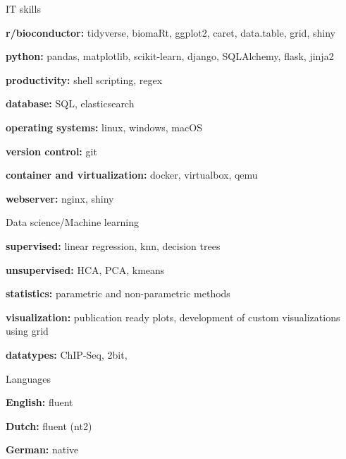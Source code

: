 

\begin{cvskills}
  \cvskill
    {IT skills} %
    {
      \begin{cvitems}
        \item {\textbf{r/bioconductor:} tidyverse, biomaRt, ggplot2, caret, data.table, grid, shiny}
        \item {\textbf{python:} pandas, matplotlib, scikit-learn, django, SQLAlchemy, flask, jinja2}
        \item {\textbf{productivity:} shell scripting, regex}
        \item {\textbf{database:} SQL, elasticsearch}
        \item {\textbf{operating systems:} linux, windows, macOS}
        \item {\textbf{version control:} git}
        \item {\textbf{container and virtualization:} docker, virtualbox, qemu}
        \item {\textbf{webserver:} nginx, shiny}
      \end{cvitems}
      }
      
  \cvskill
    {Data science/Machine learning}%
    {
      \begin{cvitems}
        \item {\textbf{supervised:} linear regression, knn, decision trees}
        \item {\textbf{unsupervised:} HCA, PCA, kmeans}
        \item {\textbf{statistics:} parametric and non-parametric methods}
        \item {\textbf{visualization:} publication ready plots, development of custom visualizations using grid}
        \item {\textbf{datatypes:} ChIP-Seq, 2bit, }
      \end{cvitems}
    }
  \cvskill
    {Languages} %
    {
      \begin{cvitems}
        \item {\textbf{English:} fluent}
        \item {\textbf{Dutch:} fluent (nt2)}
        \item {\textbf{German:} native}
      \end{cvitems}
    }
\end{cvskills}
